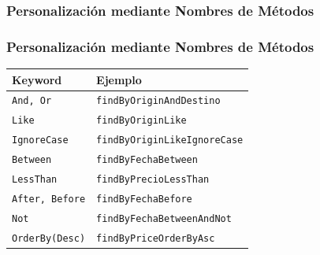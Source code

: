 \documentclass[a4paper,slidestop,xcolor=pst,blue]{beamer}
\newcommand{\ann}[1]{\color{blue}\texttt{#1}\color{black}}
\begin{document}
\begin{frame}[c,fragile]
    \frametitle{Personalización mediante Nombres de Métodos}
\end{frame}

\begin{frame}[c,fragile]
    \frametitle{Personalización mediante Nombres de Métodos}
    \begin{center}
    \begin{tabular}{l|l}
    Keyword             & Ejemplo                             \\\hline
    \ann{And, Or}       & \texttt{findByOriginAndDestino}     \\
    \ann{Like}          & \texttt{findByOriginLike}           \\
    \ann{IgnoreCase}    & \texttt{findByOriginLikeIgnoreCase} \\
    \ann{Between}       & \texttt{findByFechaBetween}       \\
    \ann{LessThan}      & \texttt{findByPrecioLessThan}     \\
    \ann{After, Before} & \texttt{findByFechaBefore}        \\
    \ann{Not}           & \texttt{findByFechaBetweenAndNot} \\
    \ann{OrderBy(Desc)} & \texttt{findByPriceOrderByAsc}    \\
    \end{tabular}
    \end{center}
\end{frame}


%
%
\end{document}
